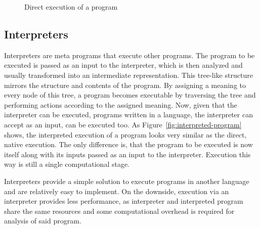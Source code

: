 \begin{figure}
  \centering
  \caption{Direct execution of a program}\label{fig:native-program}
\end{figure}



\subsection{Interpreters}

Interpreters are meta programs that execute other programs.
The program to be executed is passed as an input to the interpreter, which is then analyzed and usually transformed into an intermediate representation.
This tree-like structure mirrors the structure and contents of the program.
By assigning a meaning to every node of this tree, a program becomes executable by traversing the tree and performing actions according to the assigned meaning.
Now, given that the interpreter can be executed, programs written in a language, the interpreter can accept as an input, can be executed too.
As Figure~\ref{fig:interpreted-program} shows, the interpreted execution of a program looks very similar as the direct, native execution.
The only difference is, that the program to be executed is now itself along with its inputs passed as an input to the interpreter.
Execution this way is still a single computational stage.

Interpreters provide a simple solution to execute programs in another language and are relatively easy to implement.
On the downside, execution via an interpreter provides less performance, as interpreter and interpreted program share the same resources and some computational overhead is required for analysis of said program.

